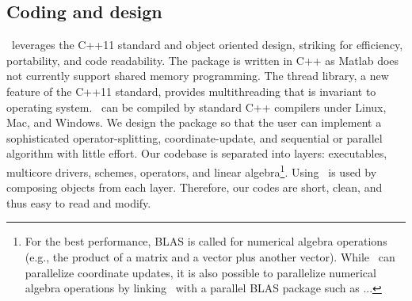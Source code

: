 \subsection{Coding and design}
\pkg~leverages the C++11 standard and object oriented design, striking for efficiency, portability, and code readability. The package is written in C++ as Matlab does not currently support shared memory programming. The thread library, a new feature of the C++11 standard, provides multithreading that is invariant to operating system. \pkg~can be compiled by standard C++ compilers  under Linux, Mac, and Windows. We design the package so that the user can implement a sophisticated operator-splitting, coordinate-update, and sequential or parallel algorithm  with little effort. Our codebase is separated into layers: executables, multicore drivers, schemes, operators, and linear algebra\footnote{For the best performance, BLAS is called for numerical algebra operations (e.g., the product of a matrix and a vector plus another vector). While \pkg~can parallelize coordinate updates, it is also possible to parallelize numerical algebra operations by linking \pkg~with a parallel BLAS package such as ...}.  Using \pkg~is used by composing objects from each layer. 
Therefore, our codes  are short, clean, and thus easy to read and modify.


 
